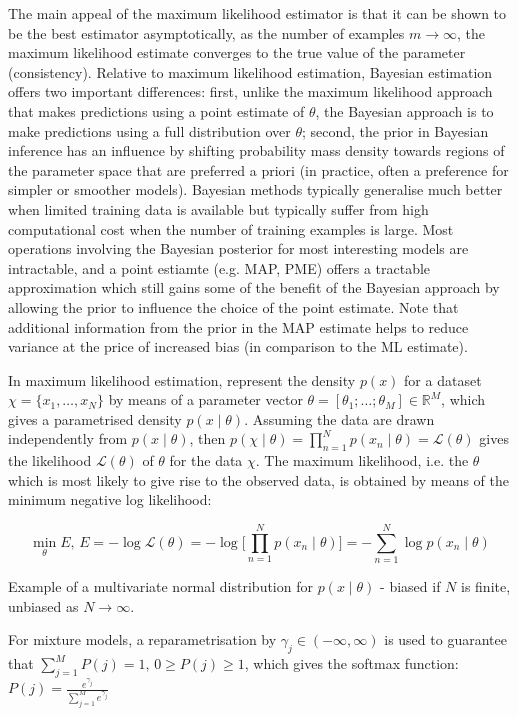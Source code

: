 The main appeal of the maximum likelihood estimator is that it can be shown to be the best estimator asymptotically, as the number of examples $m \rightarrow \infty$, the maximum likelihood estimate converges to the true value of the parameter (consistency).
Relative to maximum likelihood estimation, Bayesian estimation offers two important differences:
first, unlike the maximum likelihood approach that makes predictions using a point estimate of $\theta$, the Bayesian approach is to make predictions using a full distribution over $\theta$;
second, the prior in Bayesian inference has an influence by shifting probability mass density towards regions of the parameter space that are preferred a priori (in practice, often a preference for simpler or smoother models).
Bayesian methods typically generalise much better when limited training data is available but typically suffer from high computational cost when the number of training examples is large.
Most operations involving the Bayesian posterior for most interesting models are intractable, and a point estiamte (e.g. MAP, PME) offers a tractable approximation which still gains some of the benefit of the Bayesian approach by allowing the prior to influence the choice of the point estimate.
Note that additional information from the prior in the MAP estimate helps to reduce variance at the price of increased bias (in comparison to the ML estimate).

In maximum likelihood estimation, represent the density $p(x)$ for a dataset $\chi = \{x_1, \dots, x_N\}$
by means of a parameter vector $\theta = [\theta_1; \dots; \theta_M] \in \mathbb{R}^M$, which gives a parametrised density $p(x \mid \theta)$.
Assuming the data are drawn independently from $p(x \mid \theta)$, then $p(\chi \mid \theta) = \prod_{n=1}^N{p(x_n \mid \theta)} = \mathcal{L}(\theta)$ gives the likelihood $\mathcal{L}(\theta)$ of $\theta$ for the data $\chi$.
The maximum likelihood, i.e. the $\theta$ which is most likely to give rise to the observed data, is obtained by means of the minimum negative log likelihood:

$$\min_\theta{E}, \, E = - \log{\mathcal{L}(\theta)} = - \log{\big[ \prod_{n=1}^N{p(x_n \mid \theta)} \big]} = - \sum_{n=1}^N{\log{p(x_n \mid \theta)}}$$

Example of a multivariate normal distribution for $p(x \mid \theta)$ - biased if $N$ is finite, unbiased as $N \rightarrow \infty$.

For mixture models, a reparametrisation by $\gamma_j \in (- \infty, \infty)$ is used to guarantee that $\sum_{j=1}^M{P(j)} = 1, \, 0 \geq P(j) \geq 1$,
which gives the softmax function: $P(j) = \frac{e^{\gamma_j}}{\sum_{j=1}^M{e^{\gamma_j}}}$


